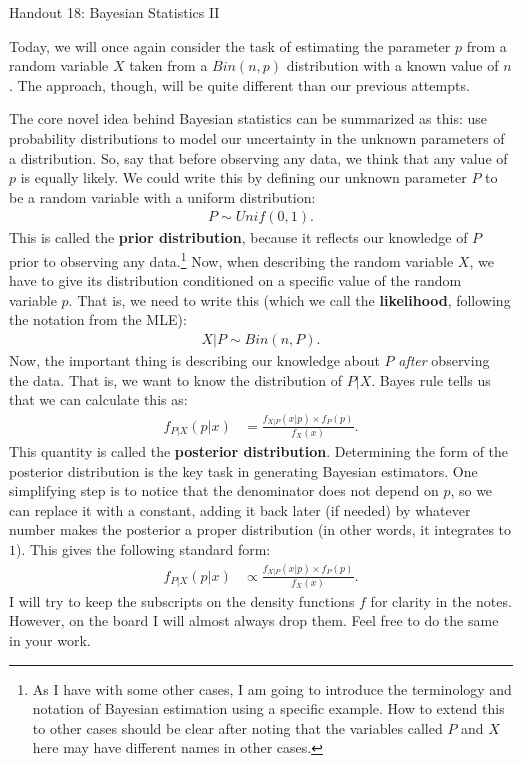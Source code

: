 \documentclass{tufte-handout}
\begin{document}
\justify

{\LARGE Handout 18: Bayesian Statistics II}

\vspace*{18pt}

\noindent
Today, we will once again consider the task of estimating the 
parameter $p$ from a random variable $X$ taken from a $Bin(n, p)$
distribution with a known value of $n$. The approach, though,
will be quite different than our previous attempts. 

The core novel idea behind Bayesian statistics can be summarized
as this: use probability distributions to model our uncertainty in
the unknown parameters of a distribution. So, say that before 
observing any data, we think that any value of $p$ is equally
likely. We could write this by defining our unknown parameter $P$
to be a random variable with a uniform distribution:
\begin{align*}
P \sim Unif(0, 1).
\end{align*}
This is called the \textbf{prior distribution}, because it reflects
our knowledge of $P$ prior to observing any data.\footnote{
  As I have with some other cases, I am going to introduce the
  terminology and notation of Bayesian estimation using a specific
  example. How to extend this to other cases should be clear after
  noting that the variables called $P$ and $X$ here may have different
  names in other cases.
}
Now, when describing
the random variable $X$, we have to give its distribution conditioned
on a specific value of the random variable $p$. That is, we need to
write this (which we call the \textbf{likelihood}, following the notation
from the MLE):
\begin{align*}
X|P \sim Bin(n, P).
\end{align*}
Now, the important thing is describing our knowledge about $P$ \textit{after}
observing the data. That is, we want to know the distribution of $P | X$.
Bayes rule tells us that we can calculate this as:
\begin{align*}
f_{P|X}(p|x) &= \frac{f_{X|P}(x|p) \times f_{P}(p)}{f_{X}(x)}.
\end{align*}
This quantity is called the \textbf{posterior distribution}. Determining
the form of the posterior distribution is the key task in generating
Bayesian estimators. One simplifying step is to notice that the denominator
does not depend on $p$, so we can replace it with a constant, adding it
back later (if needed) by whatever number makes the posterior a proper
distribution (in other words, it integrates to $1$). This gives the following
standard form:
\begin{align*}
f_{P|X}(p|x) &\propto \frac{f_{X|P}(x|p) \times f_{P}(p)}{f_{X}(x)}.
\end{align*}
I will try to keep the subscripts on the density functions $f$
for clarity in the notes. However, on the board I will almost always drop
them. Feel free to do the same in your work.
\end{document}
